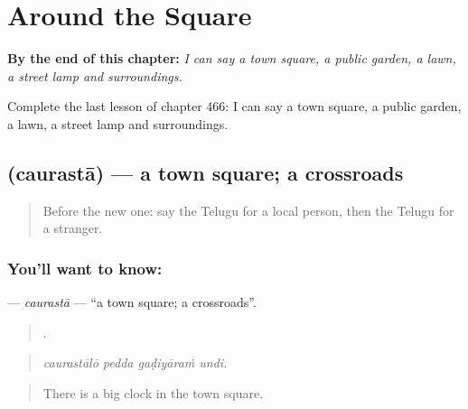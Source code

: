 
\chapter{Around the Square}
\label{ch:te-around-the-square}

\begin{chapteropening}
\textbf{By the end of this chapter:} \emph{I can say a town square, a public garden, a lawn, a street lamp and surroundings.}

Complete the last lesson of chapter 466: I can say a town square, a public garden, a lawn, a street lamp and surroundings.
\end{chapteropening}

\section[\texorpdfstring{\te{చౌరస్తా} (caurastā)}{చౌరస్తా (caurastā)}]{ (caurastā) — a town square; a crossroads}

\label{lesson:TE-C466-caurasta}



\begin{quote}
Before the new one: say the Telugu for a local person, then the Telugu for a stranger.
\end{quote}

\subsection*{You'll want to know: }
\textbf{} — \emph{caurastā} — \textquotedblleft{}a town square; a crossroads\textquotedblright{}.

\begin{quote}
   .
\end{quote}

\begin{quote}
\emph{caurastālō pedda gaḍiyāraṁ undi.}
\end{quote}

\begin{quote}
There is a big clock in the town square.
\end{quote}

